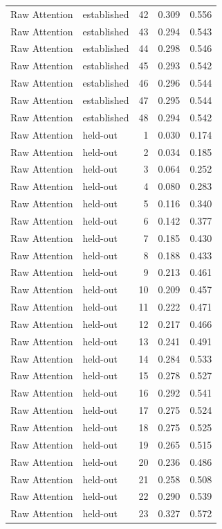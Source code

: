 \begin{tabular}{llrrr}
Raw Attention & established & 42 & 0.309 & 0.556 \\
Raw Attention & established & 43 & 0.294 & 0.543 \\
Raw Attention & established & 44 & 0.298 & 0.546 \\
Raw Attention & established & 45 & 0.293 & 0.542 \\
Raw Attention & established & 46 & 0.296 & 0.544 \\
Raw Attention & established & 47 & 0.295 & 0.544 \\
Raw Attention & established & 48 & 0.294 & 0.542 \\
Raw Attention & held-out & 1 & 0.030 & 0.174 \\
Raw Attention & held-out & 2 & 0.034 & 0.185 \\
Raw Attention & held-out & 3 & 0.064 & 0.252 \\
Raw Attention & held-out & 4 & 0.080 & 0.283 \\
Raw Attention & held-out & 5 & 0.116 & 0.340 \\
Raw Attention & held-out & 6 & 0.142 & 0.377 \\
Raw Attention & held-out & 7 & 0.185 & 0.430 \\
Raw Attention & held-out & 8 & 0.188 & 0.433 \\
Raw Attention & held-out & 9 & 0.213 & 0.461 \\
Raw Attention & held-out & 10 & 0.209 & 0.457 \\
Raw Attention & held-out & 11 & 0.222 & 0.471 \\
Raw Attention & held-out & 12 & 0.217 & 0.466 \\
Raw Attention & held-out & 13 & 0.241 & 0.491 \\
Raw Attention & held-out & 14 & 0.284 & 0.533 \\
Raw Attention & held-out & 15 & 0.278 & 0.527 \\
Raw Attention & held-out & 16 & 0.292 & 0.541 \\
Raw Attention & held-out & 17 & 0.275 & 0.524 \\
Raw Attention & held-out & 18 & 0.275 & 0.525 \\
Raw Attention & held-out & 19 & 0.265 & 0.515 \\
Raw Attention & held-out & 20 & 0.236 & 0.486 \\
Raw Attention & held-out & 21 & 0.258 & 0.508 \\
Raw Attention & held-out & 22 & 0.290 & 0.539 \\
Raw Attention & held-out & 23 & 0.327 & 0.572 \\

\end{tabular}
